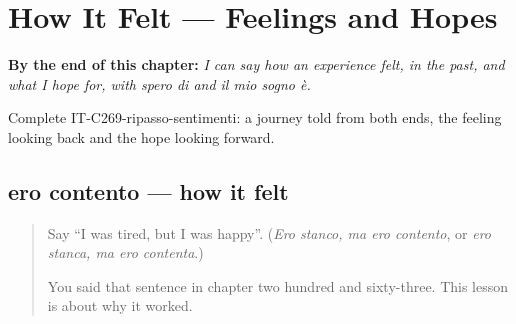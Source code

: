 
\chapter{How It Felt --- Feelings and Hopes}
\label{ch:it-feelings-and-hopes}

\begin{chapteropening}
\textbf{By the end of this chapter:} \emph{I can say how an experience felt, in the past, and what I hope for, with spero di and il mio sogno è.}

Complete IT-C269-ripasso-sentimenti: a journey told from both ends, the feeling looking back and the hope looking forward.
\end{chapteropening}

\section[ero contento, ero contenta]{ero contento — how it felt}

\label{lesson:IT-C269-ero-contento}



\begin{quote}
Say \textquotedblleft{}I was tired, but I was happy\textquotedblright{}. (\emph{Ero stanco, ma ero contento}, or \emph{ero stanca, ma ero contenta}.)

You said that sentence in chapter two hundred and sixty-three. This lesson is about why it worked.
\end{quote}

